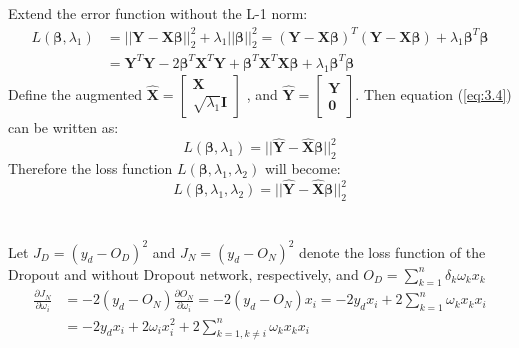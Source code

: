 \documentclass[11pt]{scrartcl} %
\begin{document}
	\subsection{} 
	Extend the error function without the L-1 norm:
	\begin{equation} \label{eq:3.4}
		\begin{aligned}
			L(\boldsymbol{\beta}, \lambda_1) &= 
			||\boldsymbol{Y}-\boldsymbol{X\beta}||_2^2 + \lambda_1||\boldsymbol{\beta}||_2^2=
			(\boldsymbol{Y}-\boldsymbol{X\beta})^T (\boldsymbol{Y}-\boldsymbol{X\beta}) +
			\lambda_1 \boldsymbol{\beta}^T \boldsymbol{\beta} \\
			&=\boldsymbol{Y}^T\boldsymbol{Y} - 2\boldsymbol{\beta}^T\boldsymbol{X}^T\boldsymbol{Y} +
			\boldsymbol{\beta}^T\boldsymbol{X}^T\boldsymbol{X\beta}+
			\lambda_1 \boldsymbol{\beta}^T \boldsymbol{\beta}
		\end{aligned}
	\end{equation}
	Define the augmented $\boldsymbol{\hat{X}} = \begin{bmatrix}
		\boldsymbol{X}\\
		\sqrt{\lambda_1}\boldsymbol{I}
	\end{bmatrix}$
	, and $\boldsymbol{\hat{Y}} = \begin{bmatrix}
		\boldsymbol{Y}\\
		\boldsymbol{0}
	\end{bmatrix}$. Then equation (\ref{eq:3.4}) can be written as:
	\begin{equation}
		L(\boldsymbol{\beta}, \lambda_1) = 
			||\boldsymbol{\hat{Y}}-\boldsymbol{\hat{X}\beta}||_2^2
	\end{equation}
	Therefore the loss function $L(\boldsymbol{\beta}, \lambda_1, \lambda_2) $ will become:
	\begin{equation}
		L(\boldsymbol{\beta}, \lambda_1, \lambda_2) = ||\boldsymbol{\hat{Y}}-\boldsymbol{\hat{X}\beta}||_2^2
	\end{equation}


\section{} %
	\subsection{}
		Let $J_D = (y_d- O_D)^2$ and $J_N = (y_d- O_N)^2$
		denote the loss function of the Dropout and without Dropout network, respectively, and 
		$O_D = \sum_{k=1}^n{\delta_k\omega_k x_k}$
		\begin{equation}
			\begin{aligned}
				\frac{\partial{J_N}}{\partial{\omega_i}} &= 
				-2(y_d - O_N)\frac{\partial{O_N}}{\partial{\omega_i}} =
				-2(y_d - O_N)x_i = 
				-2y_d x_i + 2 \sum_{k=1}^n{\omega_k x_k x_i} \\
				&= -2y_d x_i +2\omega_i x_i^2 + 2 \sum_{k=1, k\neq{i}}^n{\omega_k x_k x_i}
			\end{aligned}
		\end{equation}
		
\end{document}
